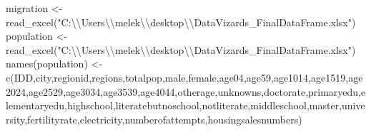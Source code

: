 \documentclass[
  11pt,
  a4paper,
  DIV=11,
  numbers=noendperiod]{scrartcl}
\newenvironment{Shaded}{\begin{snugshade}}{\end{snugshade}}
\newcommand{\FunctionTok}[1]{\textcolor[rgb]{0.28,0.35,0.67}{#1}}
\newcommand{\NormalTok}[1]{\textcolor[rgb]{0.00,0.23,0.31}{#1}}
\newcommand{\OtherTok}[1]{\textcolor[rgb]{0.00,0.23,0.31}{#1}}
\newcommand{\SpecialCharTok}[1]{\textcolor[rgb]{0.37,0.37,0.37}{#1}}
\newcommand{\StringTok}[1]{\textcolor[rgb]{0.13,0.47,0.30}{#1}}
\begin{document}
\begin{Shaded}
\begin{Highlighting}[]
\NormalTok{migration }\OtherTok{\textless{}{-}} \FunctionTok{read\_excel}\NormalTok{(}\StringTok{"C:}\SpecialCharTok{\textbackslash{}\textbackslash{}}\StringTok{Users}\SpecialCharTok{\textbackslash{}\textbackslash{}}\StringTok{melek}\SpecialCharTok{\textbackslash{}\textbackslash{}}\StringTok{desktop}\SpecialCharTok{\textbackslash{}\textbackslash{}}\StringTok{DataVizards\_FinalDataFrame.xlsx"}\NormalTok{)}
\NormalTok{population }\OtherTok{\textless{}{-}} \FunctionTok{read\_excel}\NormalTok{(}\StringTok{"C:}\SpecialCharTok{\textbackslash{}\textbackslash{}}\StringTok{Users}\SpecialCharTok{\textbackslash{}\textbackslash{}}\StringTok{melek}\SpecialCharTok{\textbackslash{}\textbackslash{}}\StringTok{desktop}\SpecialCharTok{\textbackslash{}\textbackslash{}}\StringTok{DataVizards\_FinalDataFrame.xlsx"}\NormalTok{)}
\FunctionTok{names}\NormalTok{(population) }\OtherTok{\textless{}{-}} \FunctionTok{c}\NormalTok{(}\StringTok{\textquotesingle{}IDD\textquotesingle{}}\NormalTok{,}\StringTok{\textquotesingle{}city\textquotesingle{}}\NormalTok{,}\StringTok{\textquotesingle{}regionid\textquotesingle{}}\NormalTok{,}\StringTok{\textquotesingle{}regions\textquotesingle{}}\NormalTok{,}\StringTok{\textquotesingle{}totalpop\textquotesingle{}}\NormalTok{,}\StringTok{\textquotesingle{}male\textquotesingle{}}\NormalTok{,}\StringTok{\textquotesingle{}female\textquotesingle{}}\NormalTok{,}\StringTok{\textquotesingle{}age04\textquotesingle{}}\NormalTok{,}\StringTok{\textquotesingle{}age59\textquotesingle{}}\NormalTok{,}\StringTok{\textquotesingle{}age1014\textquotesingle{}}\NormalTok{,}\StringTok{\textquotesingle{}age1519\textquotesingle{}}\NormalTok{,}\StringTok{\textquotesingle{}age2024\textquotesingle{}}\NormalTok{,}\StringTok{\textquotesingle{}age2529\textquotesingle{}}\NormalTok{,}\StringTok{\textquotesingle{}age3034\textquotesingle{}}\NormalTok{,}\StringTok{\textquotesingle{}age3539\textquotesingle{}}\NormalTok{,}\StringTok{\textquotesingle{}age4044\textquotesingle{}}\NormalTok{,}\StringTok{\textquotesingle{}otherage\textquotesingle{}}\NormalTok{,}\StringTok{\textquotesingle{}unknowns\textquotesingle{}}\NormalTok{,}\StringTok{\textquotesingle{}doctorate\textquotesingle{}}\NormalTok{,}\StringTok{\textquotesingle{}primaryedu\textquotesingle{}}\NormalTok{,}\StringTok{\textquotesingle{}elementaryedu\textquotesingle{}}\NormalTok{,}\StringTok{\textquotesingle{}highschool\textquotesingle{}}\NormalTok{,}\StringTok{\textquotesingle{}literatebutnoschool\textquotesingle{}}\NormalTok{,}\StringTok{\textquotesingle{}notliterate\textquotesingle{}}\NormalTok{,}\StringTok{\textquotesingle{}middleschool\textquotesingle{}}\NormalTok{,}\StringTok{\textquotesingle{}master\textquotesingle{}}\NormalTok{,}\StringTok{\textquotesingle{}university\textquotesingle{}}\NormalTok{,}\StringTok{\textquotesingle{}fertilityrate\textquotesingle{}}\NormalTok{,}\StringTok{\textquotesingle{}electricity\textquotesingle{}}\NormalTok{,}\StringTok{\textquotesingle{}numberofattempts\textquotesingle{}}\NormalTok{,}\StringTok{\textquotesingle{}housingsalesnumbers\textquotesingle{}}\NormalTok{)}


\end{Highlighting}
\end{Shaded}
\end{document}
